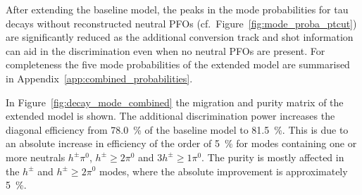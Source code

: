After extending the baseline model, the peaks in the mode probabilities for tau
decays without reconstructed neutral PFOs (cf.\
Figure~\ref{fig:mode_proba_ptcut}) are significantly reduced as the additional
conversion track and shot information can aid in the discrimination even when no
neutral PFOs are present. For completeness the five mode probabilities of the
extended model are summarised in Appendix~\ref{app:combined_probabilities}.

In Figure~\ref{fig:decay_mode_combined} the migration and purity matrix of the
extended model is shown. The additional discrimination power increases the
diagonal efficiency from \SI{78.0}{\percent} of the baseline model to
\SI{81.5}{\percent}. This is due to an absolute increase in efficiency of the
order of \SI{5}{\percent} for modes containing one or more neutrals
$h^\pm \pi^0$, $h^\pm \geq 2\pi^0$ and $3h^\pm\geq1\pi^0$. The purity is mostly
affected in the $h^\pm$ and $h^\pm \geq 2\pi^0$ modes, where the absolute
improvement is approximately \SI{5}{\percent}.

